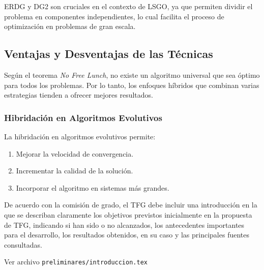 ERDG y DG2 son cruciales en el contexto de LSGO, ya que permiten dividir el problema en componentes independientes, lo cual facilita el proceso de optimización en problemas de gran escala.

\subsection*{Ventajas y Desventajas de las Técnicas}

Según el teorema \textit{No Free Lunch}, no existe un algoritmo universal que sea óptimo para todos los problemas. Por lo tanto, los enfoques híbridos que combinan varias estrategias tienden a ofrecer mejores resultados.

\subsubsection*{Hibridación en Algoritmos Evolutivos}

La hibridación en algoritmos evolutivos permite:
\begin{enumerate}
    \item Mejorar la velocidad de convergencia.
    \item Incrementar la calidad de la solución.
    \item Incorporar el algoritmo en sistemas más grandes.
\end{enumerate}

%
De acuerdo con la comisión de grado, el TFG debe incluir una introducción en la que se describan claramente los objetivos previstos inicialmente en la propuesta de TFG, indicando si han sido o no alcanzados, los antecedentes importantes para el desarrollo, los resultados obtenidos, en su caso y las principales fuentes consultadas.
%


Ver archivo \texttt{preliminares/introduccion.tex}

\endinput
